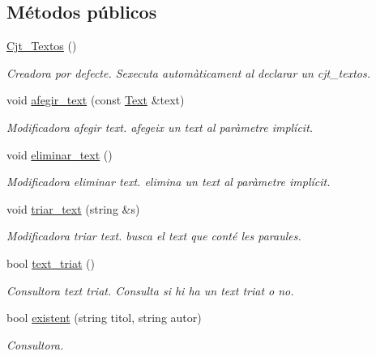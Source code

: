 \subsection*{Métodos públicos}
\begin{DoxyCompactItemize}
\item 
\hyperlink{class_cjt___textos_a294e9acbffc974a871f9417579390ad4}{Cjt\+\_\+\+Textos} ()
\begin{DoxyCompactList}\small\item\em Creadora por defecte. S\textquotesingle{}executa automàticament al declarar un cjt\+\_\+textos. \end{DoxyCompactList}\item 
void \hyperlink{class_cjt___textos_a1f8b5c6cf35bc96e409855ac93002a62}{afegir\+\_\+text} (const \hyperlink{class_text}{Text} \&text)
\begin{DoxyCompactList}\small\item\em Modificadora afegir text. afegeix un text al paràmetre implícit. \end{DoxyCompactList}\item 
void \hyperlink{class_cjt___textos_a69c7fdefd849715024904dda5fa32118}{eliminar\+\_\+text} ()
\begin{DoxyCompactList}\small\item\em Modificadora eliminar text. elimina un text al paràmetre implícit. \end{DoxyCompactList}\item 
void \hyperlink{class_cjt___textos_aa2e5ac744d6306047c6cdda58aad5c19}{triar\+\_\+text} (string \&s)
\begin{DoxyCompactList}\small\item\em Modificadora triar text. busca el text que conté les paraules. \end{DoxyCompactList}\item 
bool \hyperlink{class_cjt___textos_abd1ec8b9d6bfdeea602dea3398dd0599}{text\+\_\+triat} ()
\begin{DoxyCompactList}\small\item\em Consultora text triat. Consulta si hi ha un text triat o no. \end{DoxyCompactList}\item 
bool \hyperlink{class_cjt___textos_a04f209abc7bbeb2d55715a32f950a8df}{existent} (string titol, string autor)
\begin{DoxyCompactList}\small\item\em Consultora. \end{DoxyCompactList}\item 

\end{DoxyCompactItemize}
